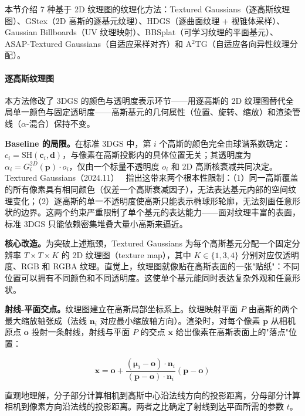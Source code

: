 本节介绍 7 种基于 2D 纹理图的纹理化方法：Textured Gaussians（逐高斯纹理图）、GStex（2D 高斯的逐基元纹理）、HDGS（逐曲面纹理 + 视锥体采样）、Gaussian Billboards（UV 纹理映射）、BBSplat（可学习纹理的平面基元）、ASAP-Textured Gaussians（自适应采样对齐）和 A$^2$TG（自适应各向异性纹理分配）。

\paragraph{逐高斯纹理图}

本方法修改了 3DGS 的颜色与透明度表示环节——用逐高斯的 2D 纹理图替代全局单一颜色与固定透明度——高斯基元的几何属性（位置、旋转、缩放）和渲染管线（$\alpha$-混合）保持不变。

\textbf{Baseline 的局限。}在标准 3DGS 中，第 $i$ 个高斯的颜色完全由球谐系数确定：$c_i = \mathrm{SH}(\mathbf{c}_i, \mathbf{d})$，与像素在高斯投影内的具体位置无关；其透明度为 $\alpha_i = G_i^{2D}(\mathbf{p}) \cdot o_i$，仅由一个标量不透明度 $o_i$ 和 2D 高斯核衰减共同决定。Textured Gaussians（2024.11）~\cite{2411_18625} 指出这带来两个根本性限制：（1）同一高斯覆盖的所有像素具有相同颜色（仅差一个高斯衰减因子），无法表达基元内部的空间纹理变化；（2）逐高斯的单一不透明度使高斯只能表示椭球形轮廓，无法刻画任意形状的边界。这两个约束严重限制了单个基元的表达能力——面对纹理丰富的表面，标准 3DGS 只能依赖密集堆叠大量小高斯来逼近。

\textbf{核心改造。}为突破上述瓶颈，Textured Gaussians 为每个高斯基元分配一个固定分辨率 $T \times T \times K$ 的 2D 纹理图（texture map），其中 $K \in \{1, 3, 4\}$ 分别对应仅透明度、RGB 和 RGBA 纹理。直觉上，纹理图就像贴在高斯表面的一张"贴纸"：不同位置可以拥有不同颜色和不同透明度。这使单个基元能同时表达复杂外观和任意形状。

\textbf{射线-平面交点。}纹理图建立在高斯局部坐标系上。纹理映射平面 $P$ 由高斯的两个最大缩放轴张成（法线 $\mathbf{n}_i$ 对应最小缩放轴方向）。渲染时，对每个像素 $\mathbf{p}$ 从相机原点 $\mathbf{o}$ 投射一条射线，射线与平面 $P$ 的交点 $\mathbf{x}$ 给出像素在高斯表面上的"落点"位置：

\begin{equation}
\mathbf{x} = \mathbf{o} + \frac{(\boldsymbol{\mu}_i - \mathbf{o}) \cdot \mathbf{n}_i}{(\mathbf{p} - \mathbf{o}) \cdot \mathbf{n}_i} (\mathbf{p} - \mathbf{o})
\end{equation}

直观地理解，分子部分计算相机到高斯中心沿法线方向的投影距离，分母部分计算相机到像素方向沿法线的投影距离。两者之比确定了射线到达平面所需的参数 $t$。

